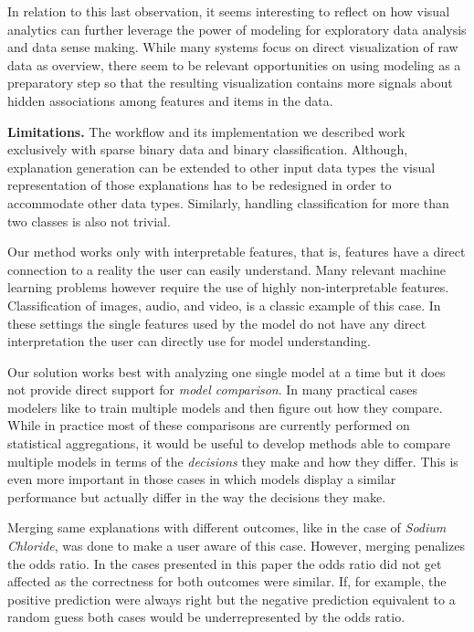 In relation to this last observation, it seems interesting to reflect on how visual analytics can further leverage the power of modeling for exploratory data analysis and data sense making. While many %
systems focus on direct visualization of raw data as overview, there seem to be relevant opportunities on using modeling as a preparatory step so that the resulting visualization contains more signals about hidden associations among features and items in the data.

\par \noindent \textbf{Limitations.}
The workflow and its implementation we described work exclusively with sparse binary data and binary classification. Although, explanation generation can be extended to other input data types the visual representation of those explanations has to be redesigned in order to accommodate other data types. Similarly, handling classification for more than two classes is also not trivial.

Our method works only with interpretable features, that is, features have a direct connection to a reality the user can easily understand. Many relevant machine learning problems however require the use of highly non-interpretable features. Classification of images, audio, and video, is a classic example of this case. In these settings the single features used by the model do not have any direct interpretation the user can directly use for model understanding.

Our solution works best with analyzing one single model at a time but it does not provide direct support for \textit{model comparison}. In many practical cases modelers like to train multiple models and then figure out how they compare. While in practice most of these comparisons are currently performed on statistical aggregations, it would be useful to develop methods able to compare multiple models in terms of the \textit{decisions} they make and how they differ. This is even more important in those cases in which models display a similar performance but actually differ in the way the decisions they make.

Merging same explanations with different outcomes, like in the case of \emph{Sodium Chloride}, was done to make a user aware of this case. However, merging penalizes the odds ratio. In the cases presented in this paper the odds ratio did not get affected as the correctness for both outcomes were similar. If, for example, the positive prediction were always right but the negative prediction equivalent to a random guess both cases would be underrepresented by the odds ratio.

